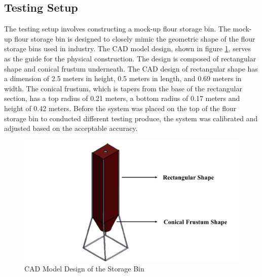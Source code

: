 \subsection{Testing Setup}
The testing setup involves constructing a mock-up flour storage bin. The mock-up flour storage bin is designed to closely mimic the geometric shape of the flour storage bins used in industry. The CAD model design, shown in figure \ref{ch3:fig:cad_storage_bin}, serves as the guide for the physical construction. The design is composed of rectangular shape and conical frustum underneath. The CAD design of rectangular shape has a dimension of 2.5 meters in height, 0.5 meters in length, and 0.69 meters in width. The conical frustum, which is tapers from the base of the rectangular section, has a top radius of 0.21 meters, a bottom radius of 0.17 meters and height of 0.42 meters. Before the system was placed on the top of the flour storage bin to conducted different testing produce, the system was calibrated and adjusted based on the acceptable accuracy.

\begin{figure}[H]
	\centering
	\includegraphics[width=1\textwidth]{Figures/cad_storage_bin}
	\caption{CAD Model Design of the Storage Bin}
	\label{ch3:fig:cad_storage_bin}
\end{figure}


